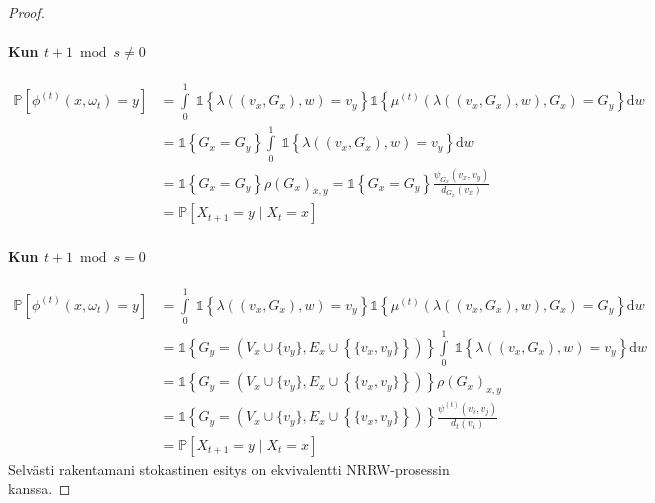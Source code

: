 \documentclass[finnish, 12pt, a4paper, sci, utf8, pdfa]{aaltothesis}
\newcommand{\indicator}{\mathopen{\mathds{1}}}
\newcommand*{\prob}{\mathbb{P}}
\begin{document}
\begin{proof}
\paragraph{Kun $ t + 1 \bmod s \neq 0 $}
\begin{align*}
   \prob \left[ \phi^{(t)}(x, \omega_{t}) = y \right] &= \int\limits_0^1 \; \indicator \left\{ \lambda\left( (v_{x}, G_{x}), w \right) = v_{y} \right\} \indicator \left\{ \mu^{(t)} \left( \lambda\left( (v_{x}, G_{x}), w \right), G_{x} \right) = G_{y} \right\} \mathrm{d}w \\
                                                &= \indicator \left\{ G_{x} = G_{y} \right\} \int\limits_0^1 \; \indicator \left\{ \lambda\left( (v_{x}, G_{x}), w \right) = v_{y} \right\} \mathrm{d}w \\
                                                &= \indicator \left\{ G_{x} = G_{y} \right\} \rho(G_{x})_{x,y} = \indicator \left\{ G_{x} = G_{y} \right\} \frac{\psi_{G_{x}}(v_{x}, v_{y})}{d_{G_{x}}(v_{x})} \\
                                                &= \prob \left[ X_{t+1} = y \mid X_{t} = x \right]
\end{align*}

\paragraph{Kun $ t + 1 \bmod s = 0 $}

\begin{align*}
   \prob \left[ \phi^{(t)}(x, \omega_{t}) = y \right] &= \int\limits_0^1 \; \indicator \left\{ \lambda\left( (v_{x}, G_{x}), w \right) = v_{y} \right\} \indicator \left\{ \mu^{(t)} \left( \lambda\left( (v_{x}, G_{x}), w \right), G_{x} \right) = G_{y} \right\} \mathrm{d}w \\
                                                &= \indicator \left\{ G_{y} = (V_{x} \cup \{ v_{y} \}, E_{x} \cup \left\{ \{ v_{x}, v_{y} \} \right\}) \right\} \int\limits_0^1 \; \indicator \left\{ \lambda\left( (v_{x}, G_{x}), w \right) = v_{y} \right\}  \mathrm{d}w \\
                                                &= \indicator \left\{ G_{y} = (V_{x} \cup \{ v_{y} \}, E_{x} \cup \left\{ \{ v_{x}, v_{y} \} \right\}) \right\} \rho(G_{x})_{x,y} \\
                                                &= \indicator \left\{ G_{y} = (V_{x} \cup \{ v_{y} \}, E_{x} \cup \left\{ \{ v_{x}, v_{y} \} \right\}) \right\} \frac{\psi^{(t)}(v_{i}, v_{j})}{d_{t}(v_{i})} \\
                                                &= \prob \left[ X_{t+1} = y \mid X_{t} = x \right]
\end{align*}
Selvästi rakentamani stokastinen esitys on ekvivalentti NRRW-prosessin kanssa.

\end{proof}
\end{document}
